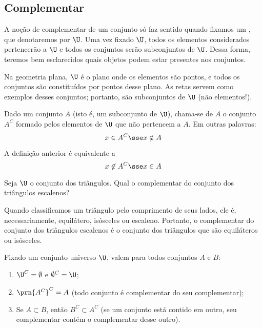 \subsection{Complementar}
A noção de complementar de um conjunto só faz sentido quando fixamos um , que denotaremos por $\U$.
Uma vez fixado $\U$, todos os elementos considerados pertencerão a $\U$ e todos os conjuntos serão subconjuntos de $\U$.
Dessa forma, teremos bem esclarecidos quais objetos podem estar presentes nos conjuntos.

\begin{example}
Na geometria plana, $\U$ é o plano onde os elementos são pontos, e todos os conjuntos são constituídos por pontos desse plano. As retas servem como exemplos desses conjuntos; portanto, são subconjuntos de $\U$ (não elementos!).
\end{example}

\begin{definition}[Complementar]
\label{def:complementar}
Dado um conjunto $A$ (isto é, um subconjunto de $\U$), chama-se  de $A$ o conjunto $A^C$ formado pelos elementos de $\U$ que não pertencem a $A$.
Em outras palavras:
$$
x \in A^C \sse x \notin A
$$
\end{definition}

\begin{remark}
\label{obs:def-complementar}
A definição anterior é equivalente a
$$
x \not \in A^C \sse x \in A
$$
\end{remark}

\begin{example}
Seja $\U$ o conjunto dos triângulos.
Qual o complementar do conjunto dos triângulos escalenos?
\end{example}

\begin{solution}
	Quando classificamos um triângulo pelo comprimento de seus lados, ele é, necessariamente, equilátero, isósceles ou escaleno. Portanto, o complementar do conjunto dos triângulos escalenos é o conjunto dos triângulos que são equiláteros ou isósceles.
\end{solution}

\begin{proposition}
\label{prop-complementar}
Fixado um conjunto universo $\U$, valem para todos conjuntos $A$ e $B$:
\begin{enumerate}
	\item $\U^C=\emptyset$ e $\emptyset^C = \U$;
	\item $\prn{A^C}^C=A$ (todo conjunto é complementar do seu complementar);
	\item Se $A \subset B$, então $B^C \subset A^C$ (se um conjunto está contido em outro, seu complementar contém o complementar desse outro). 
\end{enumerate}
\end{proposition}

